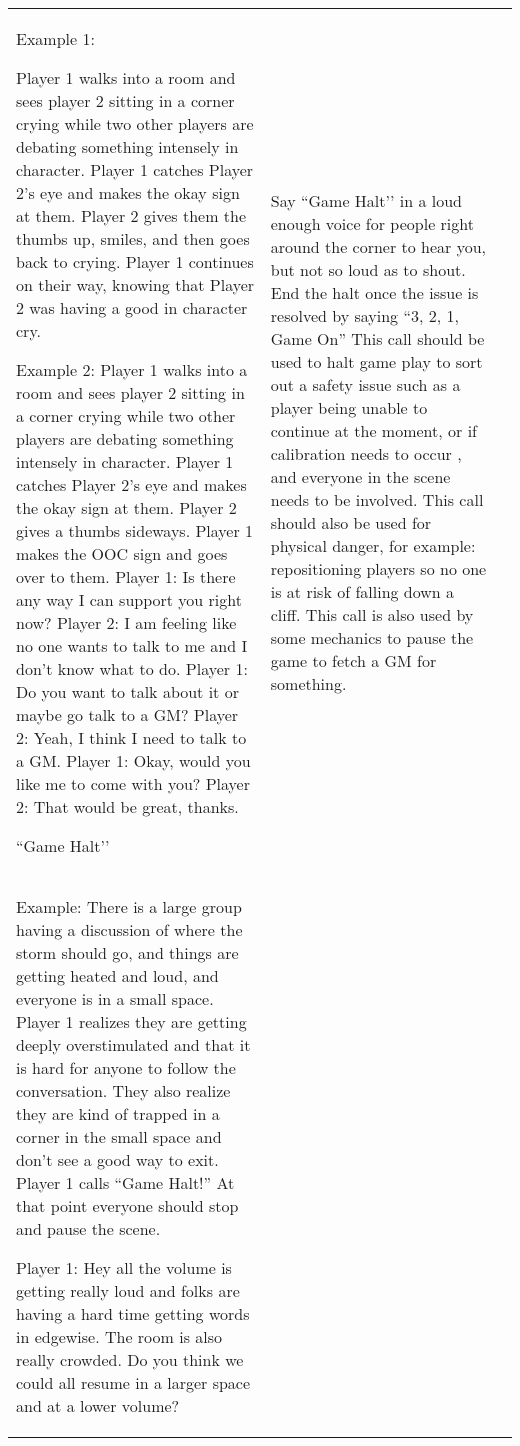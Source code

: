 \documentclass[sheet]{GL2020}
\begin{document}
\begin{tabularx}{\textwidth}{|>{\centering\arraybackslash} m{1.5cm} | >{\centering\arraybackslash} m{2.5cm} | >{\centering\arraybackslash}X |}
Example 1:

Player 1 walks into a room and sees player 2 sitting in a corner crying while two other players are debating something intensely in character.  Player 1 catches Player 2’s eye and makes the okay sign at them.  Player 2 gives them the thumbs up, smiles, and then goes back to crying.  Player 1 continues on their way, knowing that Player 2 was having a good in character cry.

Example 2:
Player 1 walks into a room and sees player 2 sitting in a corner crying while two other players are debating something intensely in character.  Player 1 catches Player 2’s eye and makes the okay sign at them. Player 2 gives a thumbs sideways.  Player 1 makes the OOC sign and goes over to them.
Player 1: Is there any way I can support you right now?
Player 2: I am feeling like no one wants to talk to me and I don’t know what to do.  
Player 1: Do you want to talk about it or maybe go talk to a GM?
Player 2: Yeah, I think I need to talk to a GM.
Player 1: Okay, would you like me to come with you?
Player 2: That would be great, thanks.
  
\hline
``Game Halt'’ & Say ``Game Halt'’ in a loud enough voice for people right around the corner to hear you, but not so loud as to shout. End the halt once the issue is resolved by saying “3, 2, 1, Game On” This call should be used to halt game play to sort out a safety issue such as a player being unable to continue at the moment, or if calibration needs to occur , and everyone in the scene needs to be involved. This call should also be used for physical danger, for example: repositioning players so no one is at risk of falling down a cliff. This call is also used by some mechanics to pause the game to fetch a GM for something. \\

Example:
There is a large group having a discussion of where the storm should go, and things are getting heated and loud, and everyone is in a small space.  Player 1 realizes they are getting deeply overstimulated and that it is hard for anyone to follow the conversation.  They also realize they are kind of trapped in a corner in the small space and don’t see a good way to exit.  Player 1 calls ``Game Halt!''  At that point everyone should stop and pause the scene.

Player 1:  Hey all the volume is getting really loud and folks are having a hard time getting words in edgewise.  The room is also really crowded.  Do you think we could all resume in a larger space and at a lower volume?


\end{tabularx}
\end{document}
